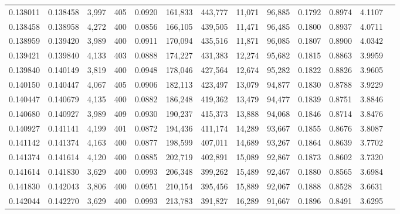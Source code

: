 \begin{tabular}{rrrrrrrrrrrrr}
0.138011 & 0.138458 & 3,997 & 405 &                                     0.0920 & 161,833 & 443,777 &  11,071 &  96,885 & 0.1792 & 0.8974 & 4.1107 \\
0.138458 & 0.138958 & 4,272 & 400 &                                     0.0856 & 166,105 & 439,505 &  11,471 &  96,485 & 0.1800 & 0.8937 & 4.0711 \\
0.138959 & 0.139420 & 3,989 & 400 &                                     0.0911 & 170,094 & 435,516 &  11,871 &  96,085 & 0.1807 & 0.8900 & 4.0342 \\
0.139421 & 0.139840 & 4,133 & 403 &                                     0.0888 & 174,227 & 431,383 &  12,274 &  95,682 & 0.1815 & 0.8863 & 3.9959 \\
0.139840 & 0.140149 & 3,819 & 400 &                                     0.0948 & 178,046 & 427,564 &  12,674 &  95,282 & 0.1822 & 0.8826 & 3.9605 \\
0.140150 & 0.140447 & 4,067 & 405 &                                     0.0906 & 182,113 & 423,497 &  13,079 &  94,877 & 0.1830 & 0.8788 & 3.9229 \\
0.140447 & 0.140679 & 4,135 & 400 &                                     0.0882 & 186,248 & 419,362 &  13,479 &  94,477 & 0.1839 & 0.8751 & 3.8846 \\
0.140680 & 0.140927 & 3,989 & 409 &                                     0.0930 & 190,237 & 415,373 &  13,888 &  94,068 & 0.1846 & 0.8714 & 3.8476 \\
0.140927 & 0.141141 & 4,199 & 401 &                                     0.0872 & 194,436 & 411,174 &  14,289 &  93,667 & 0.1855 & 0.8676 & 3.8087 \\
0.141142 & 0.141374 & 4,163 & 400 &                                     0.0877 & 198,599 & 407,011 &  14,689 &  93,267 & 0.1864 & 0.8639 & 3.7702 \\
0.141374 & 0.141614 & 4,120 & 400 &                                     0.0885 & 202,719 & 402,891 &  15,089 &  92,867 & 0.1873 & 0.8602 & 3.7320 \\
0.141614 & 0.141830 & 3,629 & 400 &                                     0.0993 & 206,348 & 399,262 &  15,489 &  92,467 & 0.1880 & 0.8565 & 3.6984 \\
0.141830 & 0.142043 & 3,806 & 400 &                                     0.0951 & 210,154 & 395,456 &  15,889 &  92,067 & 0.1888 & 0.8528 & 3.6631 \\
0.142044 & 0.142270 & 3,629 & 400 &                                     0.0993 & 213,783 & 391,827 &  16,289 &  91,667 & 0.1896 & 0.8491 & 3.6295 \\

\end{tabular}
